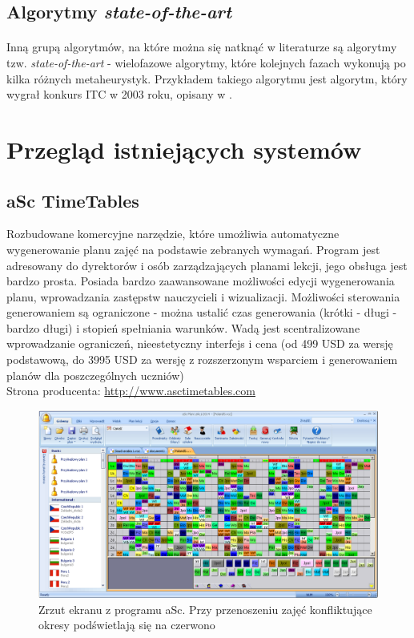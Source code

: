 \subsection{Algorytmy \textit{state-of-the-art}}

\paragraph{} Inną grupą algorytmów, na które można się natknąć w literaturze są algorytmy tzw. \textit{state-of-the-art} - wielofazowe algorytmy, które kolejnych fazach wykonują po kilka różnych metaheurystyk. Przykładem takiego algorytmu jest algorytm, który wygrał konkurs ITC w 2003 roku, opisany w \cite{kostuch}.


\section{Przegląd istniejących systemów}



\subsection{aSc TimeTables}
Rozbudowane komercyjne narzędzie, które umożliwia automatyczne wygenerowanie planu zajęć na podstawie zebranych wymagań. Program jest adresowany do dyrektorów i osób zarządzających planami lekcji, jego obsługa jest bardzo prosta. Posiada bardzo zaawansowane możliwości edycji wygenerowania planu, wprowadzania zastępstw nauczycieli i wizualizacji. Możliwości sterowania generowaniem są ograniczone - można ustalić czas generowania (krótki - długi - bardzo długi) i stopień spełniania warunków. Wadą jest scentralizowane wprowadzanie ograniczeń, nieestetyczny interfejs i cena 
(od 499 USD za wersję podstawową, do 3995 USD za wersję z rozszerzonym wsparciem i generowaniem planów dla poszczególnych uczniów) \\
Strona producenta: \url{http://www.asctimetables.com}
\begin{figure}[H]
\includegraphics[width=15cm]{img/asc2.png}
\caption{Zrzut ekranu z programu aSc. Przy przenoszeniu zajęć konfliktujące okresy podświetlają się na czerwono}
\end{figure}

